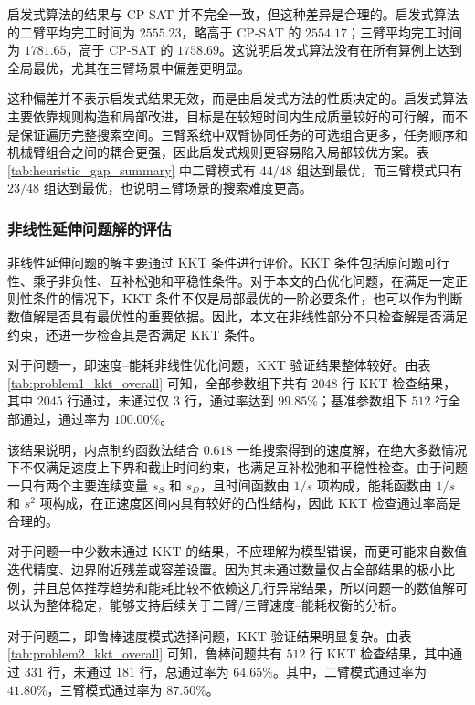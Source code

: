 启发式算法的结果与 CP-SAT 并不完全一致，但这种差异是合理的。启发式算法的二臂平均完工时间为 $2555.23$，略高于 CP-SAT 的 $2554.17$；三臂平均完工时间为 $1781.65$，高于 CP-SAT 的 $1758.69$。这说明启发式算法没有在所有算例上达到全局最优，尤其在三臂场景中偏差更明显。

这种偏差并不表示启发式结果无效，而是由启发式方法的性质决定的。启发式算法主要依靠规则构造和局部改进，目标是在较短时间内生成质量较好的可行解，而不是保证遍历完整搜索空间。三臂系统中双臂协同任务的可选组合更多，任务顺序和机械臂组合之间的耦合更强，因此启发式规则更容易陷入局部较优方案。表 \ref{tab:heuristic_gap_summary} 中二臂模式有 $44/48$ 组达到最优，而三臂模式只有 $23/48$ 组达到最优，也说明三臂场景的搜索难度更高。

\subsubsection{非线性延伸问题解的评估}

非线性延伸问题的解主要通过 KKT 条件进行评价。KKT 条件包括原问题可行性、乘子非负性、互补松弛和平稳性条件。对于本文的凸优化问题，在满足一定正则性条件的情况下，KKT 条件不仅是局部最优的一阶必要条件，也可以作为判断数值解是否具有最优性的重要依据。因此，本文在非线性部分不只检查解是否满足约束，还进一步检查其是否满足 KKT 条件。

对于问题一，即速度--能耗非线性优化问题，KKT 验证结果整体较好。由表 \ref{tab:problem1_kkt_overall} 可知，全部参数组下共有 $2048$ 行 KKT 检查结果，其中 $2045$ 行通过，未通过仅 $3$ 行，通过率达到 $99.85\%$；基准参数组下 $512$ 行全部通过，通过率为 $100.00\%$。

该结果说明，内点制约函数法结合 $0.618$ 一维搜索得到的速度解，在绝大多数情况下不仅满足速度上下界和截止时间约束，也满足互补松弛和平稳性检查。由于问题一只有两个主要连续变量 $s_S$ 和 $s_D$，且时间函数由 $1/s$ 项构成，能耗函数由 $1/s$ 和 $s^2$ 项构成，在正速度区间内具有较好的凸性结构，因此 KKT 检查通过率高是合理的。

对于问题一中少数未通过 KKT 的结果，不应理解为模型错误，而更可能来自数值迭代精度、边界附近残差或容差设置。因为其未通过数量仅占全部结果的极小比例，并且总体推荐趋势和能耗比较不依赖这几行异常结果，所以问题一的数值解可以认为整体稳定，能够支持后续关于二臂/三臂速度--能耗权衡的分析。

对于问题二，即鲁棒速度模式选择问题，KKT 验证结果明显复杂。由表 \ref{tab:problem2_kkt_overall} 可知，鲁棒问题共有 $512$ 行 KKT 检查结果，其中通过 $331$ 行，未通过 $181$ 行，总通过率为 $64.65\%$。其中，二臂模式通过率为 $41.80\%$，三臂模式通过率为 $87.50\%$。

